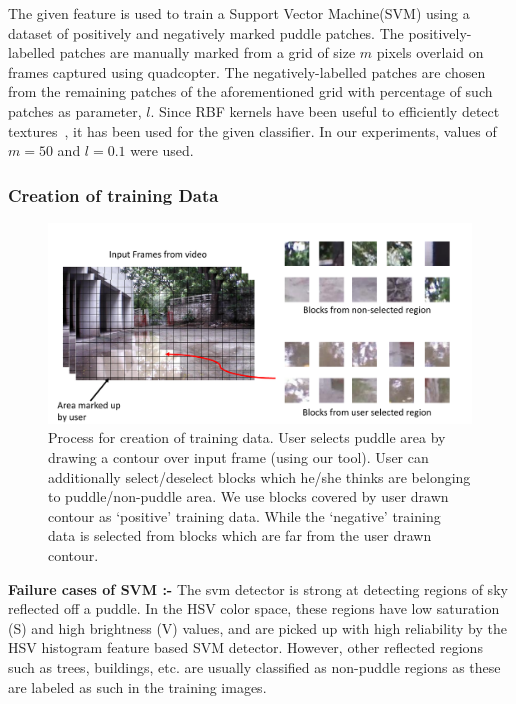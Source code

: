 \documentclass[times,10pt,twocolumn,letterpaper]{article}
\begin{document}
The given feature is used to train a Support Vector Machine(SVM) using a
dataset of positively and negatively marked puddle patches. The
positively-labelled patches are manually marked from a grid of size $m$ pixels
overlaid on frames captured using quadcopter. The negatively-labelled patches
are chosen from the remaining patches of the aforementioned grid with
percentage of such patches as parameter, $l$. Since RBF kernels have been useful
to efficiently detect textures~\cite{Chapelle99}, it has been used for the given
classifier. In our experiments, values of $m = 50$ and $l = 0.1$ were used.

\subsubsection{Creation of training Data}

\begin{figure}[h!]
\centering
\includegraphics[width=\linewidth]{images/trainingData.pdf}
\caption{Process for creation of training data. User selects puddle area by
drawing a contour over input frame (using our tool). User can additionally
select/deselect blocks which he/she thinks are belonging to puddle/non-puddle
area. We use blocks covered by user drawn contour as `positive' training data.
While the `negative' training data is selected from blocks which are far from
the user drawn contour.}
\label{fig:training}
\end{figure}

\textbf{Failure cases of SVM :- }
The svm detector is strong at detecting regions of sky reflected off a puddle.
In the HSV color space, these regions have low saturation (S) and high
brightness (V) values, and are picked up with high reliability by the HSV
histogram feature based SVM detector. However, other reflected regions such as
trees, buildings, etc. are usually classified as non-puddle regions as these
are labeled as such in the training images.
\end{document}
